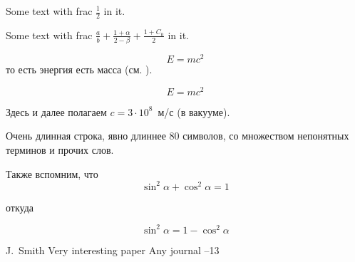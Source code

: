 \documentclass{article}
\begin{document}
Some text with frac $\frac{1}{2}$ in it.%

Some text with frac $\frac{a}{b}+\frac{1+\alpha}{2-\beta}+\frac{1+C_0}{2}$ in it.  %



\begin{equation}\label{eq1}
E=mc^2
\end{equation}
то есть энергия есть масса (см. \cite{Einstein}).

$$E=mc^2$$

Здесь и далее полагаем $c=3\cdot10^8$~м/с (в вакууме).

Очень длинная строка, явно длиннее 80 символов, со множеством непонятных терминов и прочих слов.

Также вспомним, что
\begin{equation*}
\sin^2 \alpha + \cos^2 \alpha = 1
\end{equation*}

откуда

\begin{equation*}
\sin^2 \alpha = 1 - \cos^2 \alpha
\end{equation*}

\begin{thebibliography}{99}


\by J.~Smith
\paper Very interesting paper
\jour Any journal
--13


\end{thebibliography}
\end{document}
